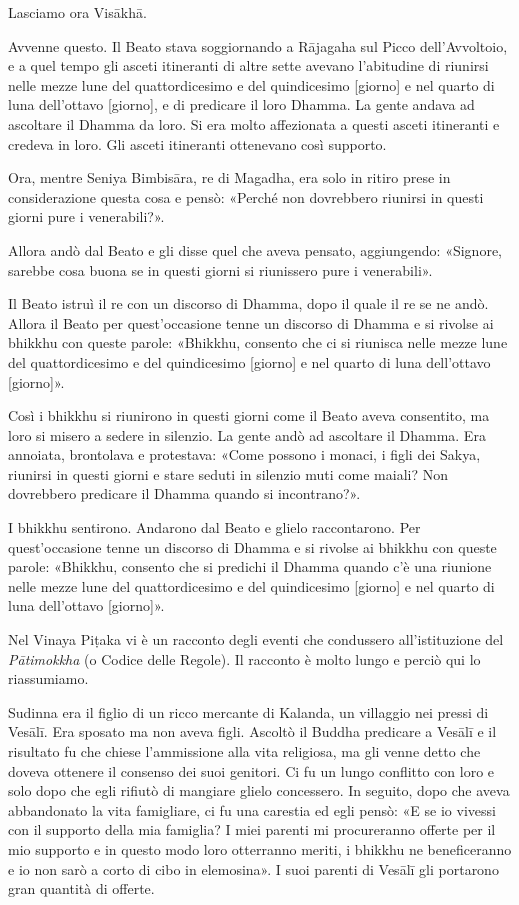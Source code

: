  Lasciamo ora Visākhā.

 Avvenne questo. Il Beato stava soggiornando a Rājagaha sul
Picco dell’Avvoltoio, e a quel tempo gli asceti itineranti di altre sette
avevano l’abitudine di riunirsi nelle mezze lune del quattordicesimo e del
quindicesimo [giorno] e nel quarto di luna dell’ottavo [giorno], e di predicare
il loro Dhamma. La gente andava ad ascoltare il Dhamma da loro. Si era molto
affezionata a questi asceti itineranti e credeva in loro. Gli asceti itineranti
ottenevano così supporto.

Ora, mentre Seniya Bimbisāra, re di Magadha, era solo in ritiro prese in
considerazione questa cosa e pensò: «Perché non dovrebbero riunirsi in questi
giorni pure i venerabili?».

Allora andò dal Beato e gli disse quel che aveva pensato, aggiungendo: «Signore,
sarebbe cosa buona se in questi giorni si riunissero pure i venerabili».

Il Beato istruì il re con un discorso di Dhamma, dopo il quale il re se ne andò.
Allora il Beato per quest’occasione tenne un discorso di Dhamma e si rivolse ai
bhikkhu con queste parole: «Bhikkhu, consento che ci si riunisca nelle mezze
lune del quattordicesimo e del quindicesimo [giorno] e nel quarto di luna
dell’ottavo [giorno]».

Così i bhikkhu si riunirono in questi giorni come il Beato aveva consentito, ma
loro si misero a sedere in silenzio. La gente andò ad ascoltare il Dhamma. Era
annoiata, brontolava e protestava: «Come possono i monaci, i figli dei Sakya,
riunirsi in questi giorni e stare seduti in silenzio muti come maiali? Non
dovrebbero predicare il Dhamma quando si incontrano?».

I bhikkhu sentirono. Andarono dal Beato e glielo raccontarono. Per
quest’occasione tenne un discorso di Dhamma e si rivolse ai bhikkhu con queste
parole: «Bhikkhu, consento che si predichi il Dhamma quando c’è una riunione
nelle mezze lune del quattordicesimo e del quindicesimo [giorno] e nel quarto di
luna dell’ottavo [giorno]».


 Nel Vinaya Piṭaka vi è un racconto degli eventi che
condussero all’istituzione del \emph{Pātimokkha} (o Codice delle Regole). Il
racconto è molto lungo e perciò qui lo riassumiamo.

 Sudinna era il figlio di un ricco mercante di
Kalanda, un villaggio nei pressi di Vesālī. Era sposato ma non aveva figli.
Ascoltò il Buddha predicare a Vesālī e il risultato fu che chiese l’ammissione
alla vita religiosa, ma gli venne detto che doveva ottenere il consenso dei suoi
genitori. Ci fu un lungo conflitto con loro e solo dopo che egli rifiutò di
mangiare glielo concessero. In seguito, dopo che aveva abbandonato la vita
famigliare, ci fu una carestia ed egli pensò: «E se io vivessi con il supporto
della mia famiglia? I miei parenti mi procureranno offerte per il mio supporto e
in questo modo loro otterranno meriti, i bhikkhu ne beneficeranno e io non sarò
a corto di cibo in elemosina». I suoi parenti di Vesālī gli portarono gran
quantità di offerte.

